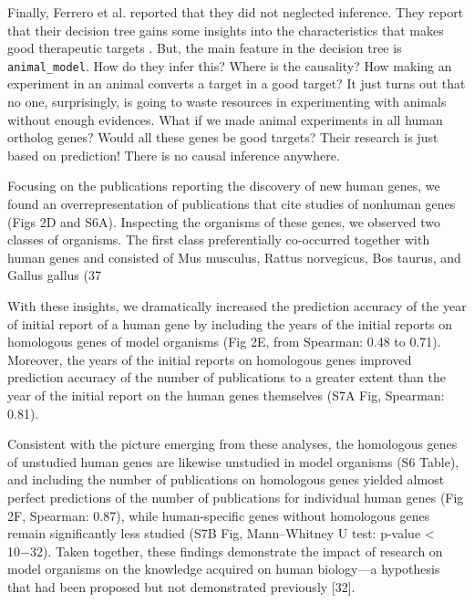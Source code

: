Finally, Ferrero et al. \cite{ferrero2017} reported that they did not neglected inference. They report that their decision tree gains some insights into the characteristics that makes good therapeutic targets \cite{ferrero2017}. But, the main feature in the decision tree is \texttt{animal\_model}. How do they infer this? Where is the causality? How making an experiment in an animal converts a target in a good target? It just turns out that no one, surprisingly, is going to waste resources in experimenting with animals without enough evidences. What if we made animal experiments in all human ortholog genes? Would all these genes be good targets? Their research is just based on prediction! There is no causal inference anywhere.

Focusing on the publications reporting the discovery of new human genes, we found an overrepresentation of publications that cite studies of nonhuman genes (Figs 2D and S6A). Inspecting the organisms of these genes, we observed two classes of organisms. The first class preferentially co-occurred together with human genes and consisted of Mus musculus, Rattus norvegicus, Bos taurus, and Gallus gallus (37%

With these insights, we dramatically increased the prediction accuracy of the year of initial report of a human gene by including the years of the initial reports on homologous genes of model organisms (Fig 2E, from Spearman: 0.48 to 0.71). Moreover, the years of the initial reports on homologous genes improved prediction accuracy of the number of publications to a greater extent than the year of the initial report on the human genes themselves (S7A Fig, Spearman: 0.81).

Consistent with the picture emerging from these analyses, the homologous genes of unstudied human genes are likewise unstudied in model organisms (S6 Table), and including the number of publications on homologous genes yielded almost perfect predictions of the number of publications for individual human genes (Fig 2F, Spearman: 0.87), while human-specific genes without homologous genes remain significantly less studied (S7B Fig, Mann–Whitney U test: p-value < 10−32). Taken together, these findings demonstrate the impact of research on model organisms on the knowledge acquired on human biology—a hypothesis that had been proposed but not demonstrated previously [32].